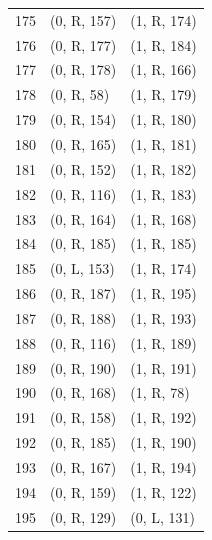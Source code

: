\begin{longtable}{rll}
175 & (0, R, 157) & (1, R, 174) \\
176 & (0, R, 177) & (1, R, 184) \\
177 & (0, R, 178) & (1, R, 166) \\
178 & (0, R, 58) & (1, R, 179) \\
179 & (0, R, 154) & (1, R, 180) \\
180 & (0, R, 165) & (1, R, 181) \\
181 & (0, R, 152) & (1, R, 182) \\
182 & (0, R, 116) & (1, R, 183) \\
183 & (0, R, 164) & (1, R, 168) \\
184 & (0, R, 185) & (1, R, 185) \\
185 & (0, L, 153) & (1, R, 174) \\
186 & (0, R, 187) & (1, R, 195) \\
187 & (0, R, 188) & (1, R, 193) \\
188 & (0, R, 116) & (1, R, 189) \\
189 & (0, R, 190) & (1, R, 191) \\
190 & (0, R, 168) & (1, R, 78) \\
191 & (0, R, 158) & (1, R, 192) \\
192 & (0, R, 185) & (1, R, 190) \\
193 & (0, R, 167) & (1, R, 194) \\
194 & (0, R, 159) & (1, R, 122) \\
195 & (0, R, 129) & (0, L, 131) \\
\bottomrule
\end{longtable}
\normalsize
